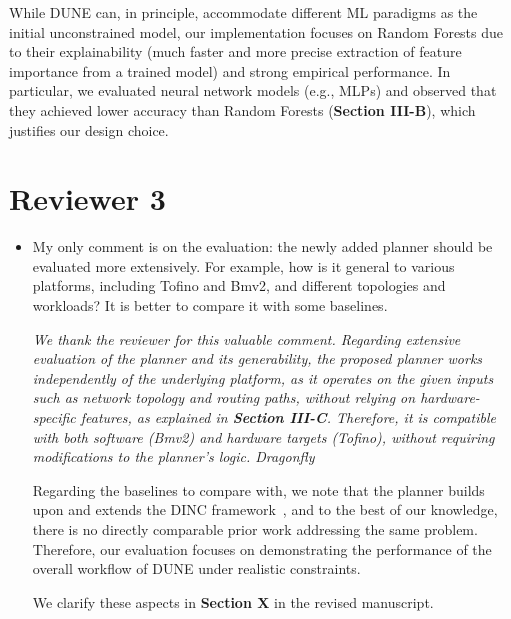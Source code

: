 \documentclass[10pt,compsoc,onecolumn,a4paper]{IEEEtran}
\begin{document}
\begin{itemize}
{While DUNE can, in principle, accommodate different ML paradigms as the initial unconstrained model, our implementation focuses on Random Forests due to their explainability (much faster and more precise extraction of feature importance from a trained model) and strong empirical performance. In particular, we evaluated neural network models (e.g., MLPs) and observed that they achieved lower accuracy than Random Forests (\textbf{Section III-B}), which justifies our design choice.


}

\end{itemize}

\section*{Reviewer 3}

\begin{itemize}

\vspace*{6pt}
\item[3.1] My only comment is on the evaluation: the newly added planner should be evaluated more extensively. For example, how is it general to various platforms, including Tofino and Bmv2, and different topologies and workloads? It is better to compare it with some baselines.

\vspace*{4pt}
{\it We thank the reviewer for this valuable comment.
Regarding extensive evaluation of the planner and its generability, the proposed planner works independently of the underlying platform, as it operates on the given inputs such as network topology and routing paths, without relying on hardware-specific features, as explained in \textbf{Section III-C}. Therefore, it is compatible with both software (Bmv2) and hardware targets (Tofino), without requiring modifications to the planner's logic.
{\color{red} Dragonfly}

Regarding the baselines to compare with, we note that the planner builds upon and extends the DINC framework~\cite{dinc-conext23}, and to the best of our knowledge, there is no directly comparable prior work addressing the same problem. Therefore, our evaluation focuses on demonstrating the performance of the overall workflow of DUNE under realistic constraints.

We clarify these aspects in \textbf{Section X} in the revised manuscript.
}

\end{itemize}

  
  
\end{document}
